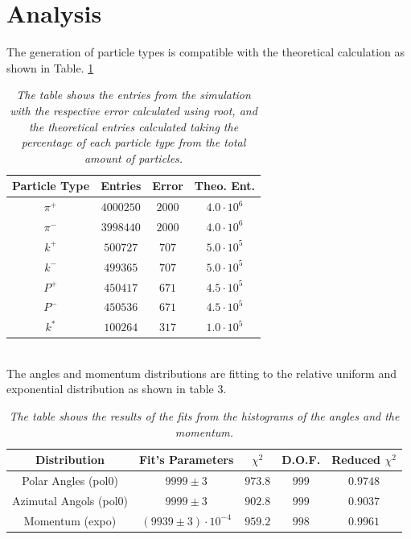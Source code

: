\documentclass[a4paper, 11pt]{article}
\begin{document}
    \section{Analysis}
    The generation of particle types is compatible with the theoretical calculation as shown in Table. \ref{Table 2}
    \begin{table}[h!]
      \centering
      \begin{tabular}{ c c c c }
        \hline
        Particle Type & Entries & Error & Theo. Ent. \\
        \hline
        $\pi^+$ & $4000250$ & $2000$ & $4.0\cdot10^6$\\
        $\pi^-$ & $3998440$ & $2000$ & $4.0\cdot10^6$\\
        $k^+$ & $500727$ & $707$ & $5.0\cdot10^5$\\
        $k^-$ & $499365$ & $707$ & $5.0\cdot10^5$\\
        $P^+$ & $450417$ & $671$ & $4.5\cdot10^5$\\
        $P^-$ & $450536$ & $671$ & $4.5\cdot10^5$\\
        $k^*$ & $100264$ & $317$ & $1.0\cdot10^5$\\
        \hline
      \end{tabular}
      \caption{ \label{Table 2}
      \textit{The table shows the entries from the simulation with the respective error calculated using root, and the theoretical entries calculated taking the percentage of each particle type from the total amount of particles.}
      }
    \end{table}\\
    The angles and momentum distributions are fitting to the relative uniform and exponential distribution as shown in table 3.
    \begin{table}[h!]
      \centering
      \begin{tabular}{ c | c c c c }
        \hline
        Distribution & Fit's Parameters & $\chi^2$ & D.O.F. & Reduced $\chi^2$ \\
        \hline
        Polar Angles (pol0) & $9999\pm3$ & $973.8$ & $999$ & $0.9748$\\
        Azimutal Angols (pol0) & $9999\pm3$ & $902.8$ & $999$ & $0.9037$\\
        Momentum (expo) & $(9939 \pm 3)\cdot10^{-4}$ & $959.2$ & $998$ & $0.9961$ \\
        \hline
      \end{tabular}
      \caption{ \label{Table 3}
      \textit{The table shows the results of the fits from the histograms of the angles and the momentum.}
      }
    \end{table}
\end{document}
